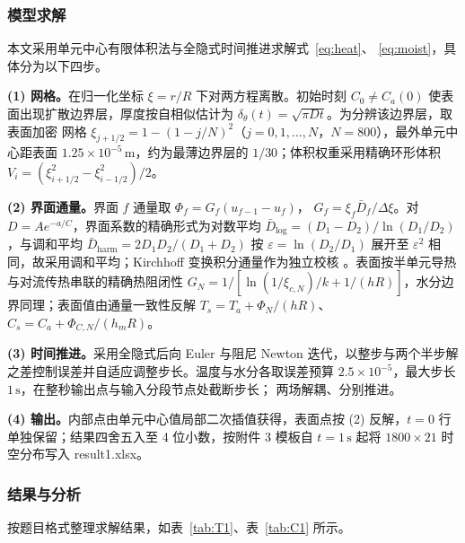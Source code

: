 
\subsubsection{模型求解}

本文采用单元中心有限体积法与全隐式时间推进求解式~\eqref{eq:heat}、
\eqref{eq:moist}，具体分为以下四步。

\textbf{(1) 网格。}在归一化坐标 $\xi=r/R$ 下对两方程离散。初始时刻
$C_0\neq C_a(0)$ 使表面出现扩散边界层，厚度按自相似估计为
$\delta_\theta(t)=\sqrt{\pi D t}$。为分辨该边界层，取表面加密
网格 $\xi_{j+1/2}=1-(1-j/N)^2$（$j=0,1,\dots,N$，$N=800$），最外单元中心距表面
$1.25\times10^{-5}\,\mathrm{m}$，约为最薄边界层的 $1/30$；体积权重采用精确环形体积
$V_i=(\xi_{i+1/2}^2-\xi_{i-1/2}^2)/2$。

\textbf{(2) 界面通量。}界面 $f$ 通量取 $\Phi_f=G_f(u_{f-1}-u_f)$，
$G_f=\xi_f\bar D_f/\Delta\xi$。对 $D=Ae^{-a/C}$，界面系数的精确形式为对数平均
$\bar D_{\log}=(D_1-D_2)/\ln(D_1/D_2)$，与调和平均
$\bar D_{\mathrm{harm}}=2D_1D_2/(D_1+D_2)$ 按 $\varepsilon=\ln(D_2/D_1)$ 展开至
$\varepsilon^2$ 相同，故采用调和平均；Kirchhoff 变换积分通量作为独立校核
\cite{srikiatden2007moisture}。表面按半单元导热与对流传热串联的精确热阻闭性
$G_N=1/[\ln(1/\xi_{c,N})/k+1/(hR)]$，水分边界同理；表面值由通量一致性反解
$T_s=T_a+\Phi_N/(hR)$、$C_s=C_a+\Phi_{C,N}/(h_mR)$。

\textbf{(3) 时间推进。}采用全隐式后向 Euler 与阻尼 Newton 迭代，以整步与两个半步解之差控制误差并自适应调整步长。温度与水分各取误差预算
$2.5\times10^{-5}$，最大步长 $1\,\mathrm{s}$，在整秒输出点与输入分段节点处截断步长；
两场解耦、分别推进。

\textbf{(4) 输出。}内部点由单元中心值局部二次插值获得，表面点按 (2) 反解，$t=0$ 行
单独保留；结果四舍五入至 4 位小数，按附件 3 模板自 $t=1\,\mathrm{s}$ 起将
$1800\times21$ 时空分布写入 result1.xlsx。

\subsubsection{结果与分析}

按题目格式整理求解结果，如表~\ref{tab:T1}、表~\ref{tab:C1} 所示。

